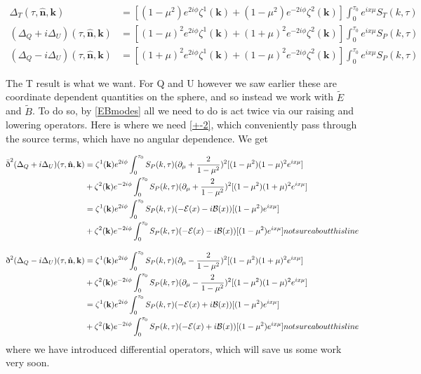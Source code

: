 \documentclass[a4paper,11pt]{article}
\renewcommand{\v}[1]{\mathbf{#1}}
\newcommand{\unit}[1]{\hat{\v{#1}}}
\newcommand{\sr}{\text{\normalfont\dh}}
\renewcommand{\sl}{\bar{\text{\normalfont\dh}}}
\begin{document}
\begin{align}
\Delta_T(\tau,\unit{n},\v{k}) &= [(1-\mu^2) e^{2i\phi} \zeta^1(\v{k})+(1-\mu^2) e^{-2i\phi} \zeta^2(\v{k})]\int_0^{\tau_0} e^{ix\mu}S_T(k,\tau)\\
(\Delta_Q+i\Delta_U)(\tau,\unit{n},\v{k}) &=[(1-\mu)^2 e^{2i\phi} \zeta^1(\v{k})+(1+\mu)^2 e^{-2i\phi} \zeta^2(\v{k})]\int_0^{\tau_0} e^{ix\mu}S_P(k,\tau)\\
(\Delta_Q-i\Delta_U)(\tau,\unit{n},\v{k}) &=[(1+\mu)^2 e^{2i\phi} \zeta^1(\v{k})+(1-\mu)^2 e^{-2i\phi} \zeta^2(\v{k})]\int_0^{\tau_0} e^{ix\mu}S_P(k,\tau)
\end{align}



The T result is what we want. For Q and U however we saw earlier these are coordinate dependent quantities on the sphere, and so instead we work with $\tilde{E}$ and $\tilde{B}$. To do so, by \ref{EBmodes} all we need to do is act twice via our raising and lowering operators. Here is where we need \ref{+-2}, which conveniently pass through the source terms, which have no angular dependence. We get

\begin{align}
\sl^2(\Delta_Q+i\Delta_U)(\tau,\unit{n},\v{k}) &= \zeta^1(\v{k})e^{2i\phi}\int_0^{\tau_0}S_P(k,\tau)(\partial_\mu+\frac{2}{1-\mu^2})^2[(1-\mu^2)(1-\mu)^2 e^{ix\mu}]\\
&{} + \zeta^2(\v{k})e^{-2i\phi}\int_0^{\tau_0}S_P(k,\tau)(\partial_\mu+\frac{2}{1-\mu^2})^2[(1-\mu^2)(1+\mu)^2 e^{ix\mu}]\\
&= \zeta^1(\v{k})e^{2i\phi}\int_0^{\tau_0}S_P(k,\tau)(-\mathcal{E}(x)-i\mathcal{B}(x))[(1-\mu^2) e^{ix\mu}] \\
&{} + \zeta^2(\v{k})e^{-2i\phi}\int_0^{\tau_0}S_P(k,\tau)(-\mathcal{E}(x)-i\mathcal{B}(x))[(1-\mu^2) e^{ix\mu}] not sure about this line
\end{align}

\begin{align}
\sr^2(\Delta_Q-i\Delta_U)(\tau,\unit{n},\v{k}) &= \zeta^1(\v{k})e^{2i\phi}\int_0^{\tau_0}S_P(k,\tau)(\partial_\mu-\frac{2}{1-\mu^2})^2[(1-\mu^2)(1+\mu)^2 e^{ix\mu}] \\ 
&{} + \zeta^2(\v{k})e^{-2i\phi}\int_0^{\tau_0}S_P(k,\tau)(\partial_\mu-\frac{2}{1-\mu^2})^2[(1-\mu^2)(1-\mu)^2 e^{ix\mu}]\\
&= \zeta^1(\v{k})e^{2i\phi}\int_0^{\tau_0}S_P(k,\tau)(-\mathcal{E}(x)+i\mathcal{B}(x))[(1-\mu^2) e^{ix\mu}] \\
&{} + \zeta^2(\v{k})e^{-2i\phi}\int_0^{\tau_0}S_P(k,\tau)(-\mathcal{E}(x)+i\mathcal{B}(x))[(1-\mu^2) e^{ix\mu}] not sure about this line
\end{align}
where we have introduced differential operators, which will save us some work very soon.
\end{document}
